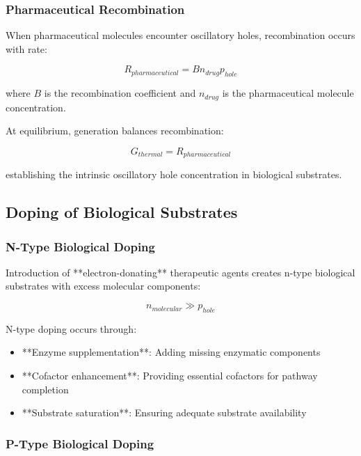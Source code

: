 \documentclass[12pt,a4paper]{article}
\begin{document}
\subsubsection{Pharmaceutical Recombination}

When pharmaceutical molecules encounter oscillatory holes, recombination occurs with rate:

\begin{equation}
R_{pharmaceutical} = B n_{drug} p_{hole}
\end{equation}

where $B$ is the recombination coefficient and $n_{drug}$ is the pharmaceutical molecule concentration.

At equilibrium, generation balances recombination:

\begin{equation}
G_{thermal} = R_{pharmaceutical}
\end{equation}

establishing the intrinsic oscillatory hole concentration in biological substrates.

\subsection{Doping of Biological Substrates}

\subsubsection{N-Type Biological Doping}

Introduction of **electron-donating** therapeutic agents creates n-type biological substrates with excess molecular components:

\begin{equation}
n_{molecular} \gg p_{hole}
\end{equation}

N-type doping occurs through:
\begin{itemize}
\item **Enzyme supplementation**: Adding missing enzymatic components
\item **Cofactor enhancement**: Providing essential cofactors for pathway completion
\item **Substrate saturation**: Ensuring adequate substrate availability
\end{itemize}

\subsubsection{P-Type Biological Doping}
\end{document}
